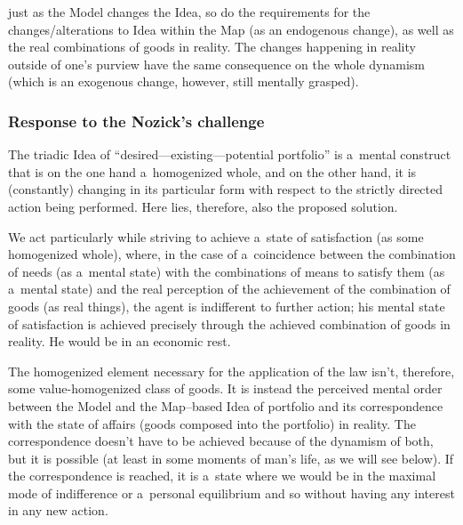 just as the Model changes the Idea, so do the requirements for the changes/alterations to Idea within the Map (as an endogenous change), as well as the real combinations of goods in reality. The changes happening in reality outside of one's purview have the same consequence on the whole dynamism (which is an exogenous change, however, still mentally grasped).



\subsubsection*{Response to the Nozick's challenge}



The triadic Idea of ``desired---existing---potential portfolio'' is a~mental construct that is on the one hand a~homogenized whole, and on the other hand, it is (constantly) changing in its particular form with respect to the strictly directed action being performed. Here lies, therefore, also the proposed solution.



We act particularly while striving to achieve a~state of satisfaction (as some homogenized whole), where, in the case of a~coincidence between the combination of needs (as a~mental state) with the combinations of means to satisfy them (as a~mental state) and the real perception of the achievement of the combination of goods (as real things), the agent is indifferent to further action; his mental state of satisfaction is achieved precisely through the achieved combination of goods in reality. He would be in an economic rest.



The homogenized element necessary for the application of the law isn't, therefore, some value-homogenized class of goods. It is instead the perceived mental order between the Model and the Map–based Idea of portfolio and its correspondence with the state of affairs (goods composed into the portfolio) in reality. The correspondence doesn't have to be achieved because of the dynamism of both, but it is possible (at least in some moments of man's life, as we will see below). If the correspondence is reached, it is a~state where we would be in the maximal mode of indifference or a~personal equilibrium and so without having any interest in any new action.



